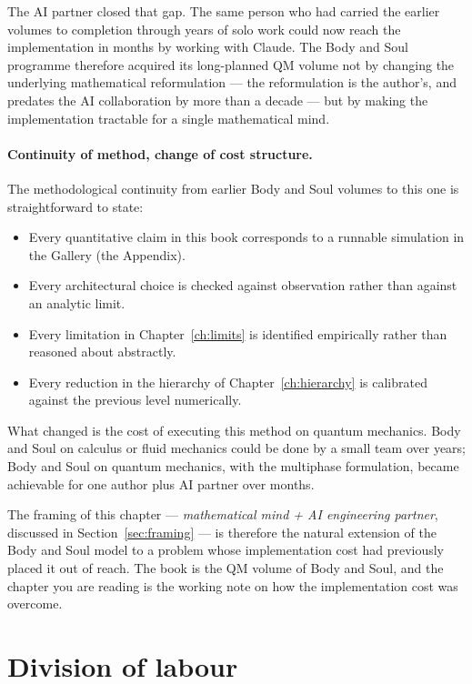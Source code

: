 The AI partner closed that gap. The same person who had carried the earlier volumes to completion through years of solo work could now reach the implementation in months by working with Claude. The Body and Soul programme therefore acquired its long-planned QM volume not by changing the underlying mathematical reformulation --- the reformulation is the author's, and predates the AI collaboration by more than a decade --- but by making the implementation tractable for a single mathematical mind.

\paragraph{Continuity of method, change of cost structure.}
The methodological continuity from earlier Body and Soul volumes to this one is straightforward to state:
\begin{itemize}
\item Every quantitative claim in this book corresponds to a runnable simulation in the Gallery (the Appendix).
\item Every architectural choice is checked against observation rather than against an analytic limit.
\item Every limitation in Chapter~\ref{ch:limits} is identified empirically rather than reasoned about abstractly.
\item Every reduction in the hierarchy of Chapter~\ref{ch:hierarchy} is calibrated against the previous level numerically.
\end{itemize}
What changed is the cost of executing this method on quantum mechanics. Body and Soul on calculus or fluid mechanics could be done by a small team over years; Body and Soul on quantum mechanics, with the multiphase formulation, became achievable for one author plus AI partner over months.

The framing of this chapter --- \emph{mathematical mind + AI engineering partner}, discussed in Section~\ref{sec:framing} --- is therefore the natural extension of the Body and Soul model to a problem whose implementation cost had previously placed it out of reach. The book is the QM volume of Body and Soul, and the chapter you are reading is the working note on how the implementation cost was overcome.

\section{Division of labour}\label{sec:division}

